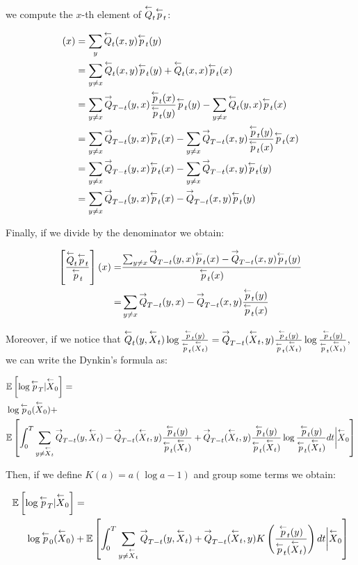 we compute the $x$-th element of $\bratesp_t\bp_t$:

\begin{align}
    [\bratesp_t\bp_t](x) &= \sum_y \bratesp_t(x,y)\bp_t(y) \\&= \sum_{y\neq x} \bratesp_t(x,y)\bp_t(y) + \bratesp_t(x,x)\bp_t(x)\nonumber\\
    &= \sum_{y\neq x} \fratesp_{T-t}(y,x)\frac{\bp_t(x)}{\bp_t(y)}\bp_t(y) - \sum_{y\neq x}\bratesp_t(y,x)\bp_t(x)\nonumber\\
    &= \sum_{y\neq x} \fratesp_{T-t}(y,x)\bp_t(x) - \sum_{y\neq x}\fratesp_{T-t}(x,y)\frac{\bp_t(y)}{\bp_t(x)}\bp_t(x)\nonumber\\
    &= \sum_{y\neq x} \fratesp_{T-t}(y,x)\bp_t(x) - \sum_{y\neq x}\fratesp_{T-t}(x,y)\bp_t(y)\nonumber
    \\
    &= \sum_{y\neq x} \fratesp_{T-t}(y,x)\bp_t(x) - \fratesp_{T-t}(x,y)\bp_t(y)\nonumber
\end{align}

Finally, if we divide by the denominator we obtain:

{\begin{align}
    \left[\frac{\bratesp_t\bp_t}{\bp_t}\right](x) = &\frac{\sum_{y\neq x} \fratesp_{T-t}(y,x)\bp_t(x) - \fratesp_{T-t}(x,y)\bp_t(y)}{\bp_t(x)} \\ = &  \sum_{y\neq x} \fratesp_{T-t}(y,x) - \fratesp_{T-t}(x,y)\frac{\bp_t(y)}{\bp_t(x)} \nonumber
\end{align}}

Moreover, if we notice that $\bratesp_t(y,\bproc_t)\log\frac{\bp_t(y)}{\bp_t(\bproc_t)}=\fratesp_{T-t}(\bproc_t,y)\frac{\bp_t(y)}{\bp_t(\bproc_t)}\log\frac{\bp_t(y)}{\bp_t(\bproc_t)}$, we can write the Dynkin's formula as:

{\begin{align}\label{eq:dynkinp}
    &\expected\left[\log\bp_T|\bproc_0\right] = \\ &\log\bp_0(\bproc_0)+ \nonumber\\ &\expected\left[\int_0^T\sum_{y\neq \bproc_t} \fratesp_{T-t}(y,\bproc_t) - \fratesp_{T-t}(\bproc_t,y)\frac{\bp_t(y)}{\bp_t(\bproc_t)}+\fratesp_{T-t}(\bproc_t,y)\frac{\bp_t(y)}{\bp_t(\bproc_t)}\log\frac{\bp_t(y)}{\bp_t(\bproc_t)}dt\bigg|\bproc_0\right] \nonumber
\end{align}}

Then, if we define $K(a)=a(\log a - 1)$ and group some terms we obtain:

\begin{align}
    \expected\left[\log\bp_T|\bproc_0\right] &= \\ \log\bp_0(\bproc_0)&+\expected\left[\int_0^T\sum_{y\neq \bproc_t} \fratesp_{T-t}(y,\bproc_t) + \fratesp_{T-t}(\bproc_t,y)K\left(\frac{\bp_t(y)}{\bp_t(\bproc_t)}\right)dt\bigg|\bproc_0\right] \nonumber
\end{align}


